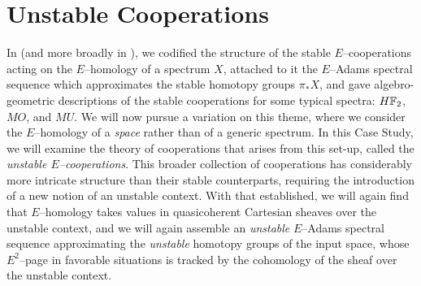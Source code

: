 
\chapter{Unstable Cooperations}\label{UnstableCooperationsChapter}


In  (and more broadly in ), we codified the structure of the stable \(E\)--cooperations acting on the \(E\)--homology of a spectrum \(X\), attached to it the \(E\)--Adams spectral sequence which approximates the stable homotopy groups \(\pi_* X\), and gave algebro-geometric descriptions of the stable cooperations for some typical spectra: \(\HFtwo\), \(MO\), and \(MU\).
We will now pursue a variation on this theme, where we consider the \(E\)--homology of a \emph{space} rather than of a generic spectrum.
In this Case Study, we will examine the theory of cooperations that arises from this set-up, called the \textit{unstable \(E\)--cooperations}.
This broader collection of cooperations has considerably more intricate structure than their stable counterparts, requiring the introduction of a new notion of an unstable context.
With that established, we will again find that \(E\)--homology takes values in quasicoherent Cartesian sheaves over the unstable context, and we will again assemble an \emph{unstable} \(E\)--Adams spectral sequence approximating the \emph{unstable} homotopy groups of the input space, whose \(E^2\)--page in favorable situations is tracked by the cohomology of the sheaf over the unstable context.

